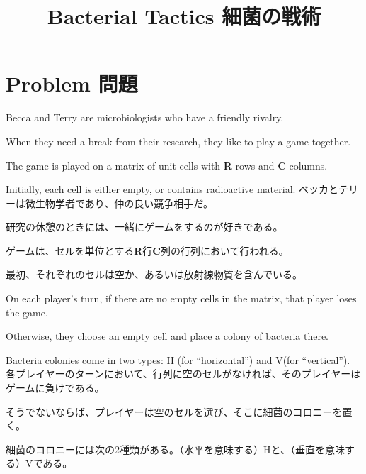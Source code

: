 \documentclass[uplatex,dvipdfmx]{jsarticle} \usepackage{amsmath,amssymb,bm}
\title{Bacterial Tactics 細菌の戦術} \author{} \date{}
\begin{document}
\maketitle
\section*{Problem 問題}
\begin{paracol}{2}
Becca and Terry are microbiologists who have a friendly rivalry.

When they need a break from their research, they like to play a game together.

The game is played on a matrix of unit cells with {\bf R} rows and {\bf C} columns.

Initially, each cell is either empty, or contains radioactive material.
\switchcolumn
ベッカとテリーは微生物学者であり、仲の良い競争相手だ。

研究の休憩のときには、一緒にゲームをするのが好きである。

ゲームは、セルを単位とする{\bf R}行{\bf C}列の行列において行われる。

最初、それぞれのセルは空か、あるいは放射線物質を含んでいる。
\end{paracol}
\vspace{\baselineskip}
\begin{paracol}{2}
On each player's turn, if there are no empty cells in the matrix, that player loses the game.

Otherwise, they choose an empty cell and place a colony of bacteria there.

Bacteria colonies come in two types: H (for ``horizontal'') and V(for ``vertical'').
\switchcolumn
各プレイヤーのターンにおいて、行列に空のセルがなければ、そのプレイヤーはゲームに負けである。

そうでないならば、プレイヤーは空のセルを選び、そこに細菌のコロニーを置く。

細菌のコロニーには次の2種類がある。（水平を意味する）Hと、（垂直を意味する）Vである。
\end{paracol}
\vspace{\baselineskip}
\end{document}
